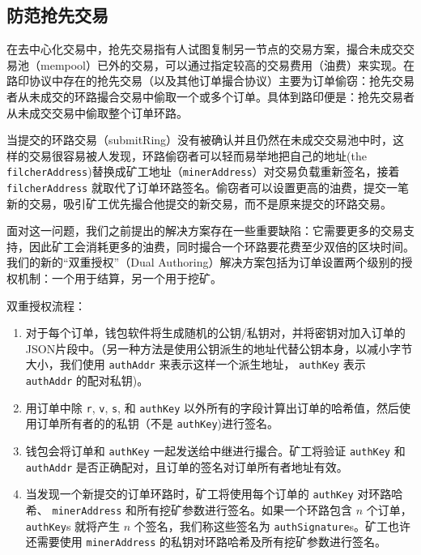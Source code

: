 \documentclass[UTF8]{ctexart}
\begin{document}
\begin{multicols}{2}
\subsection{防范抢先交易\label{sec:dual_authoring}}

在去中心化交易中，抢先交易指有人试图复制另一节点的交易方案，撮合未成交交易池（mempool）已外的交易，可以通过指定较高的交易费用（油费）来实现。在路印协议中存在的抢先交易（以及其他订单撮合协议）主要为订单偷窃：抢先交易者从未成交的环路撮合交易中偷取一个或多个订单。具体到路印便是：抢先交易者从未成交交易中偷取整个订单环路。


当提交的环路交易（submitRing）没有被确认并且仍然在未成交交易池中时，这样的交易很容易被人发现，环路偷窃者可以轻而易举地把自己的地址(the \verb|filcherAddress|)替换成矿工地址（\verb|minerAddress|）对交易负载重新签名，接着 \verb|filcherAddress| 就取代了订单环路签名。偷窃者可以设置更高的油费，提交一笔新的交易，吸引矿工优先撮合他提交的新交易，而不是原来提交的环路交易。

面对这一问题，我们之前提出的解决方案存在一些重要缺陷：它需要更多的交易支持，因此矿工会消耗更多的油费，同时撮合一个环路要花费至少双倍的区块时间。我们的新的“双重授权”（Dual Authoring）解决方案包括为订单设置两个级别的授权机制：一个用于结算，另一个用于挖矿。


双重授权流程：

\begin{enumerate}

	\item 对于每个订单，钱包软件将生成随机的公钥/私钥对，并将密钥对加入订单的JSON片段中。（另一种方法是使用公钥派生的地址代替公钥本身，以减小字节大小，我们使用 \verb|authAddr| 来表示这样一个派生地址， \verb|authKey| 表示 \verb|authAddr| 的配对私钥)。

	\item 用订单中除 \verb|r|, \verb|v|, \verb|s|, 和 \verb|authKey| 以外所有的字段计算出订单的哈希值，然后使用订单所有者的的私钥（不是 \verb|authKey|)进行签名。

	\item 钱包会将订单和 \verb|authKey| 一起发送给中继进行撮合。矿工将验证 \verb|authKey| 和 \verb|authAddr| 是否正确配对，且订单的签名对订单所有者地址有效。 

	\item 当发现一个新提交的订单环路时，矿工将使用每个订单的 \verb|authKey| 对环路哈希、 \verb|minerAddress| 和所有挖矿参数进行签名。如果一个环路包含 $n$ 个订单，\verb|authKey|s 就将产生 $n$ 个签名，我们称这些签名为 \verb|authSignature|s。矿工也许还需要使用 \verb|minerAddress| 的私钥对环路哈希及所有挖矿参数进行签名。


\end{enumerate}
\end{multicols}
\end{document}
